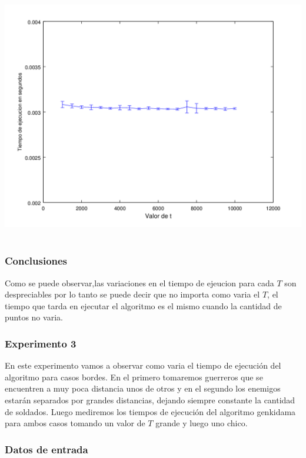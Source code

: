       	\includegraphics[height=11cm]{graficos/genkidama-exp2.png}

    	
    	\subsubsection*{Conclusiones}


			Como se puede observar,las variaciones en el tiempo de ejeucion para cada $T$ son despreciables por lo tanto se puede decir que no importa como varia el $T$, el tiempo que tarda en ejecutar el algoritmo es el mismo cuando la cantidad de puntos no varia.\;

		\;

    	\subsubsection*{Experimento 3}

			En este experimento vamos a observar como varia el tiempo de ejecución del algoritmo para casos bordes. En el primero tomaremos guerreros que se encuentren a muy poca distancia  unos de otros y en el segundo los enemigos estarán separados por grandes distancias, dejando siempre constante la cantidad de soldados. Luego mediremos los tiempos de ejecución del algoritmo genkidama para ambos casos tomando un valor de $T$ grande y luego uno chico.\;

		
		\subsubsection*{Datos de entrada}


